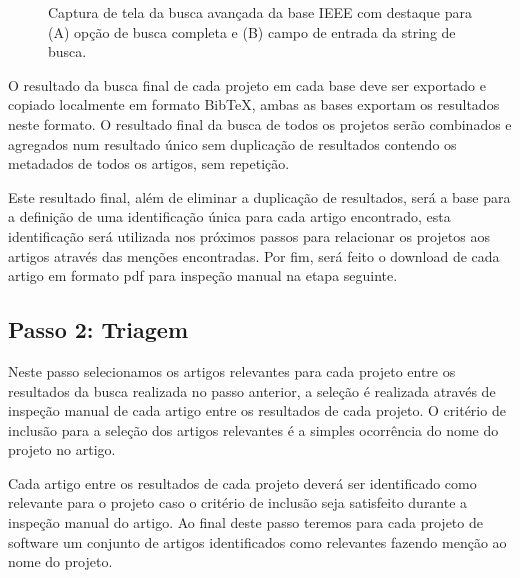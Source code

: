 \begin{figure}[h]
  \center
  \caption{Captura de tela da busca avançada da base IEEE com destaque para (A) opção de busca completa e (B) campo de entrada da string de busca.}
  \label{advanced-search-ieee}
\end{figure}

O resultado da busca final de cada projeto em cada base deve ser exportado e
copiado localmente em formato BibTeX, ambas as bases exportam os resultados
neste formato. O resultado final da busca de todos os projetos serão combinados
e agregados num resultado único sem duplicação de resultados contendo os
metadados de todos os artigos, sem repetição.

Este resultado final, além de eliminar a duplicação de resultados, será a base
para a definição de uma identificação única para cada artigo encontrado, esta
identificação será utilizada nos próximos passos para relacionar os projetos
aos artigos através das menções encontradas. Por fim, será feito o download de cada
artigo em formato pdf para inspeção manual na etapa seguinte.

\subsection{Passo 2: Triagem}

Neste passo selecionamos os artigos relevantes para cada projeto entre os
resultados da busca realizada no passo anterior, a seleção é realizada através
de inspeção manual de cada artigo entre os resultados de cada projeto. O
critério de inclusão para a seleção dos artigos relevantes é a simples
ocorrência do nome do projeto no artigo.

Cada artigo entre os resultados de cada projeto deverá ser identificado como
relevante para o projeto caso o critério de inclusão seja satisfeito durante a
inspeção manual do artigo. Ao final deste passo teremos para cada projeto
de software um conjunto de artigos identificados como relevantes fazendo
menção ao nome do projeto.

